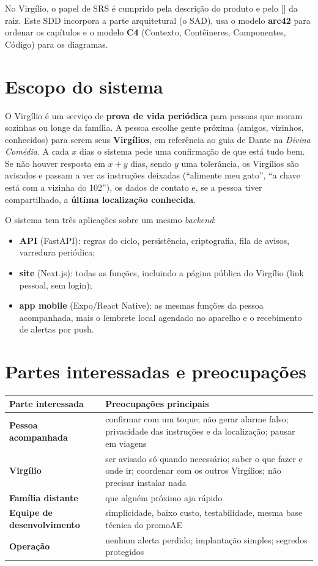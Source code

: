 \documentclass[11pt,a4paper]{report}
\DeclareRobustCommand{\code}[1]{\begingroup\noexpandarg\StrSubstitute{#1}{/}{/\allowbreak}[\monotmp]\texttt{\small\monotmp}\endgroup}
\newcommand{\arq}[1]{\code{#1}}
\begin{document}
No Virgílio, o papel de SRS é cumprido pela descrição do produto e pelo \arq{README.md} da raiz.
Este SDD incorpora a parte arquitetural (o SAD), usa o modelo \textbf{arc42} para ordenar os capítulos
e o modelo \textbf{C4} (Contexto, Contêineres, Componentes, Código) para os diagramas.

\section{Escopo do sistema}

O Virgílio é um serviço de \textbf{prova de vida periódica} para pessoas que moram sozinhas ou longe da
família. A pessoa escolhe gente próxima (amigos, vizinhos, conhecidos) para serem seus
\textbf{Virgílios}, em referência ao guia de Dante na \emph{Divina Comédia}. A cada $x$ dias o sistema
pede uma confirmação de que está tudo bem. Se não houver resposta em $x + y$ dias, sendo $y$ uma
tolerância, os Virgílios são avisados e passam a ver as instruções deixadas (``alimente meu gato'',
``a chave está com a vizinha do 102''), os dados de contato e, se a pessoa tiver compartilhado, a
\textbf{última localização conhecida}.

O sistema tem três aplicações sobre um mesmo \emph{backend}:
\begin{itemize}
  \item \textbf{API} (FastAPI): regras do ciclo, persistência, criptografia, fila de avisos, varredura periódica;
  \item \textbf{site} (Next.js): todas as funções, incluindo a página pública do Virgílio (link pessoal, sem login);
  \item \textbf{app mobile} (Expo/React Native): as mesmas funções da pessoa acompanhada, mais o lembrete
        local agendado no aparelho e o recebimento de alertas por push.
\end{itemize}

\section{Partes interessadas e preocupações}

\begin{center}
\begin{tabularx}{\textwidth}{@{}>{\bfseries}l Y@{}}
\toprule
Parte interessada & Preocupações principais \\
\midrule
Pessoa acompanhada & confirmar com um toque; não gerar alarme falso; privacidade das instruções e da localização; pausar em viagens \\
Virgílio & ser avisado só quando necessário; saber o que fazer e onde ir; coordenar com os outros Virgílios; não precisar instalar nada \\
Família distante & que alguém próximo aja rápido \\
Equipe de desenvolvimento & simplicidade, baixo custo, testabilidade, mesma base técnica do promoAE \\
Operação & nenhum alerta perdido; implantação simples; segredos protegidos \\
\bottomrule
\end{tabularx}
\end{center}
\end{document}
